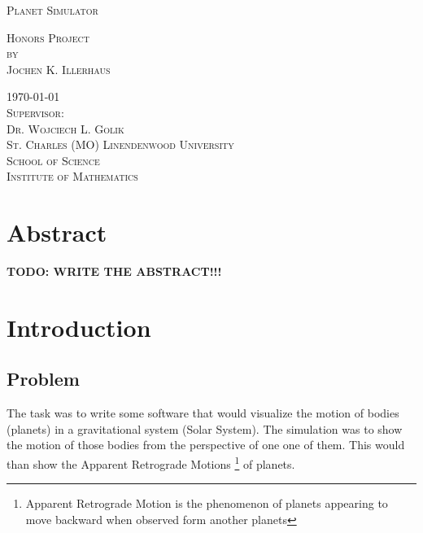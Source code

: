 \documentclass[a4paper,onesided,10pt]{article}
\begin{document}
\pagestyle{empty} %

\begin{titlepage}

\begin{center}

\Large
\textsc{Planet Simulator}\\

\vspace{5cm}

\textsc{Honors Project\\[0.5\baselineskip]
by\\[0.5\baselineskip]
Jochen K. Illerhaus}

\vspace{5cm}
\textsc{\today}\\ %

\vspace{1cm}
\textsc{Supervisor:\\
Dr. Wojciech L. Golik}\\

\vspace{1cm}
\textsc{St. Charles (MO) Linendenwood University\\
School of Science\\
Institute of Mathematics}\\

\end{center}

\end{titlepage}

\tableofcontents 

\newpage

\pagestyle{fancy} 


\section{Abstract}
\textbf{TODO: WRITE THE ABSTRACT!!!}

\section{Introduction}

\subsection{Problem}
The task was to write some software that would visualize the motion of bodies (planets) in a gravitational system (Solar System). The simulation was to show the motion of those bodies from the perspective of one one of them. This would than show the Apparent Retrograde Motions \footnote{Apparent Retrograde Motion is the phenomenon of planets appearing to move backward when observed form another planets} of planets.
\end{document}
